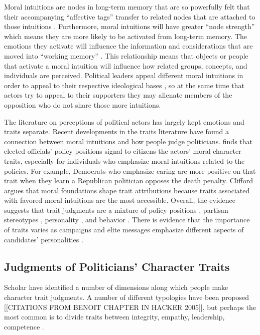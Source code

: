 Moral intuitions are nodes in long-term memory that are so powerfully felt that their accompanying ``affective tags'' transfer to related nodes that are attached to those intuitions \cite{Haidt2001,Haidt2012}. Furthermore, moral intuitions will have greater ``node strength'' which means they are more likely to be activated from long-term memory. The emotions they activate will influence the information and considerations that are moved into ``working memory'' \cite[202-203]{TaberLodgeGlathar2001}. This relationship means that objects or people that activate a moral intuition will influence how related groups, concepts, and individuals are perceived. Political leaders appeal different moral intuitions in order to appeal to their respective ideological bases \cite{CliffordJerit2013,Grahametal2009}, so at the same time that actors try to appeal to their supporters they may alienate members of the opposition who do not share those more intuitions.

The literature on perceptions of political actors has largely kept emotions and traits separate. Recent developments in the traits literature have found a connection between moral intuitions and how people judge politicians.  finds that elected officials' policy positions signal to citizens the actors' moral character traits, especially for individuals who emphasize moral intuitions related to the policies. For example, Democrats who emphasize caring are more positive on that trait when they learn a Republican politician opposes the death penalty. Clifford argues that moral foundations shape trait attributions because traits associated with favored moral intuitions are the most accessible. Overall, the evidence suggests that trait judgments are a mixture of policy positions \cite{Clifford2014}, partisan stereotypes \cite{Hayes2005,Hayes2011}, personality \cite{Kinder1986}, and behavior \cite{Funk1996a}. There is evidence that the importance of traits varies as campaigns and elite messages emphasize different aspects of candidates' personalities \cite{Funk1999}.

\subsection{Judgments of Politicians' Character Traits}
Scholar have identified a number of dimensions along which people make character trait judgments. A number of different typologies have been proposed [[CITATIONS FROM BENOIT CHAPTER IN HACKER 2005]], but perhaps the most common is to divide traits between integrity, empathy, leadership, competence \cite{Goren2007}.



